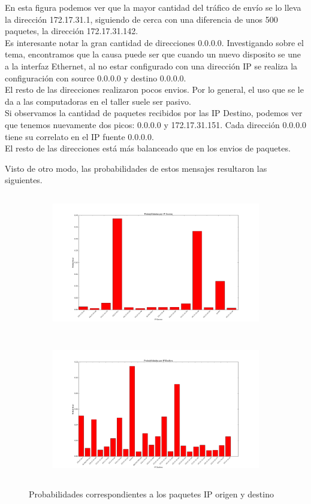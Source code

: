 En esta figura podemos ver que la mayor cantidad del tr\'afico de env\'io
se lo lleva la direcci\'on 172.17.31.1, siguiendo de cerca con una
diferencia de unos 500 paquetes, la direcci\'on 172.17.31.142. \\
Es interesante notar la gran cantidad de direcciones 0.0.0.0. Investigando sobre
el tema, encontramos que la causa puede ser que cuando un nuevo disposito se une
a la interfaz Ethernet, al no estar configurado con una direcci\'on IP se realiza la configuraci\'on
con source 0.0.0.0 y destino 0.0.0.0. \\
El resto de las direcciones realizaron pocos envios. Por lo general,
el uso que se le da a las computadoras en el taller suele ser pasivo. \\

Si observamos la cantidad de paquetes recibidos por las IP Destino, podemos
ver que tenemos nuevamente dos picos: 0.0.0.0 y 172.17.31.151. Cada direcci\'on
0.0.0.0 tiene su correlato en el IP fuente 0.0.0.0. \\
El resto de las direcciones est\'a m\'as balanceado que en los envios de
paquetes.

\newpage
Visto de otro modo, las probabilidades de estos mensajes resultaron las siguientes.

\begin{figure}[H]

\begin{subfigure}{0.6\textwidth}
\includegraphics[width=0.9\linewidth, height=6cm]{imagenes/exp3/ProbIpSource.png}
\caption{}
\end{subfigure}
\begin{subfigure}{0.6\textwidth}
\includegraphics[width=0.9\linewidth, height=6cm]{imagenes/exp3/ProbIpDest.png}
\caption{}
\end{subfigure}

\caption{Probabilidades correspondientes a los paquetes IP origen y destino}
\label{exp3grafico3}
\end{figure}

